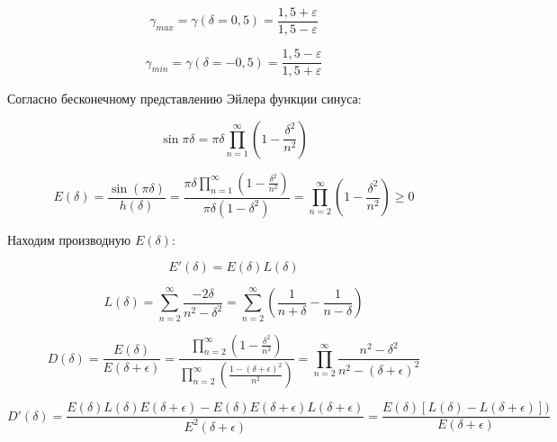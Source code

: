 \begin{equation}
	\label{eq:equation69}
	\gamma_{max} = \gamma(\delta = 0,5) = \frac{1,5+ \varepsilon}{1,5 - \varepsilon}
\end{equation}

\begin{equation}
	\label{eq:equation70}
	\gamma_{min} = \gamma(\delta = -0,5) = \frac{1,5 - \varepsilon}{1,5 + \varepsilon}
\end{equation}

Согласно бесконечному представлению Эйлера функции синуса:

\begin{equation}
	\label{eq:equation71}
	\sin \pi \delta = \pi \delta \prod\limits_{n = 1}^\infty \left( 1- \frac{\delta^2}{n^2} \right) 
\end{equation}

\begin{equation}
	\label{eq:equation72}
	E(\delta) = \frac{\sin(\pi \delta) }{h(\delta)} = \frac{\pi \delta \prod\limits_{n = 1}^\infty \left( 1- \frac{\delta^2}{n^2}\right)}{\pi \delta (1 - \delta^2)} = \prod\limits_{n = 2}^\infty \left( 1 - \frac{\delta^2}{n^2}\right) \geq 0 
\end{equation}

Находим производную $E(\delta)$:     

\begin{equation}
	\label{eq:equation73}
	E'(\delta) = E(\delta)L(\delta)
\end{equation}

\begin{equation}
	\label{eq:equation74}
	L(\delta) = \sum_{n=2}^{\infty} \frac{-2 \delta}{n^2 - \delta^2} = \sum_{n=2}^{\infty} \left(  \frac{1}{n + \delta} -  \frac{1}{n - \delta} \right) 
\end{equation}

\begin{equation}
	\label{eq:equation75}
	D(\delta) = \frac{E(\delta)}{E(\delta + \epsilon)} = \frac{\prod\limits_{n = 2}^\infty \left( 1 - \frac{\delta^2}{n^2} \right) }{\prod\limits_{n = 2}^\infty \left( \frac{1 - (\delta + \epsilon)^2}{n^2}\right)} = \prod\limits_{n = 2}^\infty \frac{n^2 - \delta^2}{n^2 - (\delta + \epsilon)^2}
\end{equation}

\begin{equation}
	\label{eq:equation76}
	D'(\delta) = \frac{E(\delta)L(\delta)E(\delta + \epsilon) - E(\delta)E(\delta + \epsilon)L(\delta + \epsilon)}{E^2 (\delta + \epsilon)} = \frac{E(\delta) [L(\delta) - L(\delta + \epsilon)])}{E(\delta + \epsilon)}
\end{equation}

